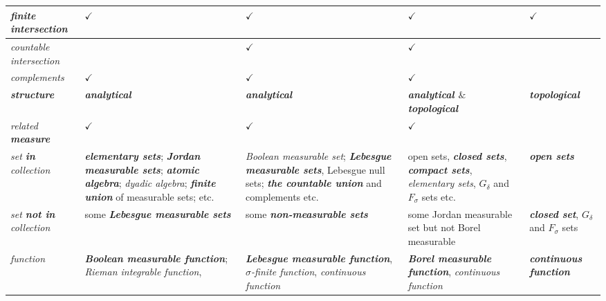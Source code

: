\documentclass[11pt]{article}
\begin{document}
\begin{table}[h!]
\begin{tabularx}{1\textwidth} { 
  | >{\raggedright\arraybackslash} m{3cm}
  | >{\centering\arraybackslash}X
  | >{\centering\arraybackslash}X
  | >{\centering\arraybackslash}X
  | >{\centering\arraybackslash}X  | }
\hline \vspace{5pt}
\emph{finite intersection} \vspace{2pt}   & $\checkmark$  & $\checkmark$  & $\checkmark$  & $\checkmark$  \\
\hline \vspace{5pt}
\emph{countable intersection} \vspace{2pt}   &   & $\checkmark$  & $\checkmark$  &   \\
\hline \vspace{5pt}
\emph{complements} \vspace{2pt}   &  $\checkmark$ & $\checkmark$ & $\checkmark$  &   \\
\hline \vspace{5pt}
\emph{\textbf{structure}} \vspace{2pt}   &  \emph{\textbf{analytical}} & \emph{\textbf{analytical}} & \emph{\textbf{analytical $\&$ topological}}  &  \emph{\textbf{topological}}  \\
\hline \vspace{5pt}
\emph{related \textbf{measure}}  \vspace{2pt}  & $\checkmark$ & $\checkmark$ &  $\checkmark$ &  \\
\hline \vspace{5pt}
\emph{set \textbf{in} collection}  \vspace{2pt}  &  \emph{\textbf{elementary sets}};  \emph{\textbf{Jordan measurable sets}}; \emph{\textbf{atomic algebra}}; \emph{dyadic algebra}; \emph{\textbf{finite union}} of measurable sets; etc. &   \emph{Boolean measurable set};  \emph{\textbf{Lebesgue measurable sets}}, Lebesgue null sets;  \emph{\textbf{the countable union}} and complements  etc.  & open sets, \emph{\textbf{closed sets}}, \emph{\textbf{compact sets}}, \emph{elementary sets}, $G_{\delta}$ and $F_{\sigma}$ sets  etc. & \emph{\textbf{open sets}} \\
\hline \vspace{5pt}
\emph{set \textbf{not in} collection}  \vspace{2pt}  & some \emph{\textbf{Lebesgue measurable sets}} & some \emph{\textbf{non-measurable sets}} & some Jordan measurable set but not Borel measurable & \emph{\textbf{closed set}}, $G_{\delta}$ and $F_{\sigma}$ sets \\
\hline \vspace{5pt}
\emph{function}  \vspace{2pt}  & \emph{\textbf{Boolean measurable function}}; \emph{Rieman integrable function}, & \emph{\textbf{Lebesgue measurable function}}, \emph{$\sigma$-finite function}, \emph{continuous function} & \emph{\textbf{Borel measurable function}}, \emph{continuous function} & \emph{\textbf{continuous function}}  \\
\hline
\end{tabularx}
\end{table}
\end{document}
